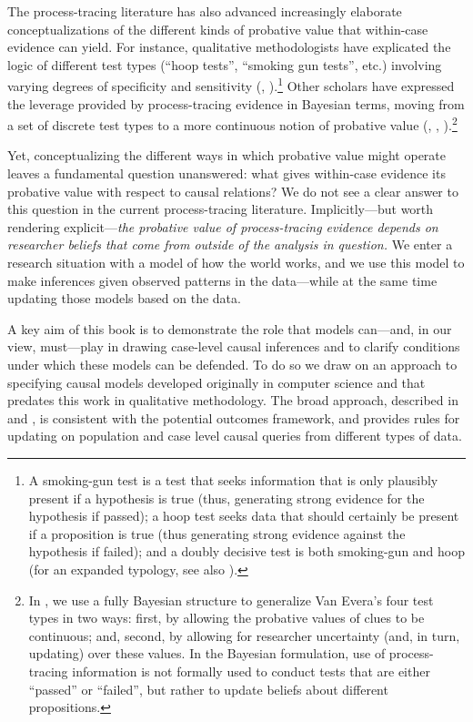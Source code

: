 \documentclass[
  12pt,
]{book}
\begin{document}
The process-tracing literature has also advanced increasingly elaborate conceptualizations of the different kinds of probative value that within-case evidence can yield. For instance, qualitative methodologists have explicated the logic of different test types (``hoop tests'', ``smoking gun tests'', etc.) involving varying degrees of specificity and sensitivity (\citet{collier2011understanding}, \citet{Mahony:Logic:2012}).\footnote{A smoking-gun test is a test that seeks information that is only plausibly present if a hypothesis is true (thus, generating strong evidence for the hypothesis if passed); a hoop test seeks data that should certainly be present if a proposition is true (thus generating strong evidence against the hypothesis if failed); and a doubly decisive test is both smoking-gun and hoop (for an expanded typology, see also \citet{rohlfing2013comparative}).} Other scholars have expressed the leverage provided by process-tracing evidence in Bayesian terms, moving from a set of discrete test types to a more continuous notion of probative value (\citet{fairfield2017explicit}, \citet{BennettAppendix}, \citet{humphreys2015mixing}).\footnote{In \citet{humphreys2015mixing}, we use a fully Bayesian structure to generalize Van Evera's four test types in two ways: first, by allowing the probative values of clues to be continuous; and, second, by allowing for researcher uncertainty (and, in turn, updating) over these values. In the Bayesian formulation, use of process-tracing information is not formally used to conduct tests that are either ``passed'' or ``failed'', but rather to update beliefs about different propositions.}

Yet, conceptualizing the different ways in which probative value might operate leaves a fundamental question unanswered: what gives within-case evidence its probative value with respect to causal relations? We do not see a clear answer to this question in the current process-tracing literature. Implicitly---but worth rendering explicit---\emph{the probative value of process-tracing evidence depends on researcher beliefs that come from outside of the analysis in question.} We enter a research situation with a model of how the world works, and we use this model to make inferences given observed patterns in the data---while at the same time updating those models based on the data.

A key aim of this book is to demonstrate the role that models can---and, in our view, must---play in drawing case-level causal inferences and to clarify conditions under which these models can be defended. To do so we draw on an approach to specifying causal models developed originally in computer science and that predates this work in qualitative methodology. The broad approach, described in \citet{cowell1999probabilistic} and \citet{pearl2009causality}, is consistent with the potential outcomes framework, and provides rules for updating on population and case level causal queries from different types of data.
\end{document}
